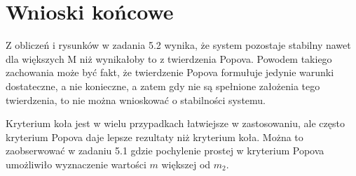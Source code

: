\documentclass[a4paper,11pt]{article}
\begin{document}
\section{Wnioski końcowe}
Z obliczeń i rysunków w zadania 5.2 wynika, że system pozostaje stabilny nawet dla większych M niż wynikałoby to z twierdzenia Popova. Powodem takiego zachowania może być fakt, że twierdzenie Popova formułuje jedynie warunki dostateczne, a nie konieczne, a zatem gdy nie są spełnione założenia tego twierdzenia, to nie można wnioskować o stabilności systemu. 


Kryterium koła jest w wielu przypadkach łatwiejsze w zastosowaniu, ale często kryterium Popova daje lepsze rezultaty niż kryterium koła. Można to zaobserwować w zadaniu 5.1 gdzie pochylenie prostej w kryterium Popova umożliwiło wyznaczenie wartości \( m \) większej od \( m_{2} \). 
\end{document}

